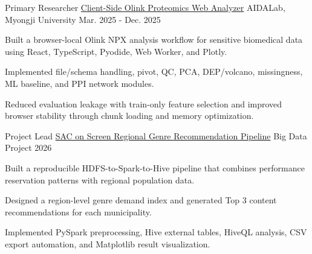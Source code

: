 

\begin{cventries}

  \cventry
    {Primary Researcher} %
    {\href{https://github.com/lthofficial01/2025-olink-analyze-tool}{Client-Side Olink Proteomics Web Analyzer}} %
    {AIDALab, Myongji University} %
    {Mar. 2025 - Dec. 2025} %
    {
      \begin{cvitems} %
        \item {Built a browser-local Olink NPX analysis workflow for sensitive biomedical data using React, TypeScript, Pyodide, Web Worker, and Plotly.}
        \item {Implemented file/schema handling, pivot, QC, PCA, DEP/volcano, missingness, ML baseline, and PPI network modules.}
        \item {Reduced evaluation leakage with train-only feature selection and improved browser stability through chunk loading and memory optimization.}
      \end{cvitems}
    }

  \cventry
    {Project Lead} %
    {\href{https://github.com/lthofficial01/2026-1-bigdata-sac-on-screen-recommendation}{SAC on Screen Regional Genre Recommendation Pipeline}} %
    {Big Data Project} %
    {2026} %
    {
      \begin{cvitems} %
        \item {Built a reproducible HDFS-to-Spark-to-Hive pipeline that combines performance reservation patterns with regional population data.}
        \item {Designed a region-level genre demand index and generated Top 3 content recommendations for each municipality.}
        \item {Implemented PySpark preprocessing, Hive external tables, HiveQL analysis, CSV export automation, and Matplotlib result visualization.}
      \end{cvitems}
    }

\end{cventries}
